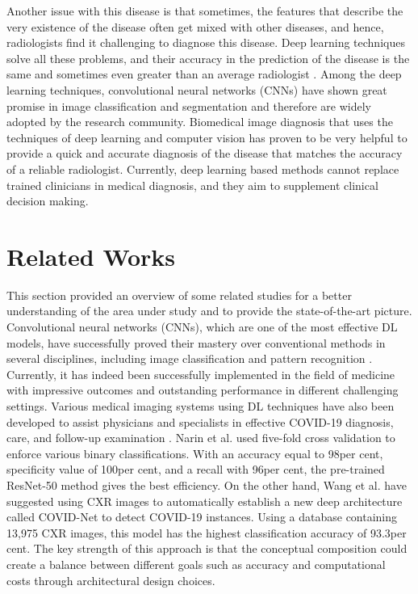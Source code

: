 \documentclass[a4paper,12pt]{report}
\begin{document}
Another issue with this disease is that sometimes, the features that describe the very existence of the disease often get mixed with other diseases, and hence, radiologists find it challenging to diagnose this disease. Deep learning techniques solve all these problems, and their accuracy in the prediction of the disease is the same and sometimes even greater than an average radiologist \cite{ref}. Among the deep learning techniques, convolutional neural networks (CNNs) have shown great promise in image classification and segmentation and therefore are widely adopted by the research community. Biomedical image diagnosis that uses the techniques of deep learning and computer vision has proven to be very helpful to provide a quick and accurate diagnosis of the disease that matches the accuracy of a reliable radiologist. Currently, deep learning based methods cannot replace trained clinicians in medical diagnosis, and they aim to supplement clinical decision making.

\section{Related Works}
This section provided an overview of some related studies for a better understanding
of the area under study and to provide the state-of-the-art picture. Convolutional neural
networks (CNNs), which are one of the most effective DL models, have successfully proved
their mastery over conventional methods in several disciplines, including image classification and pattern recognition \cite{ref13,ref14}. Currently, it has indeed been successfully implemented
in the field of medicine with impressive outcomes and outstanding performance in different
challenging settings. Various medical imaging systems using DL techniques have also been
developed to assist physicians and specialists in effective COVID-19 diagnosis, care, and
follow-up examination \cite{ref15,ref16}. Narin et al. \cite{ref11} used five-fold cross validation to enforce
various binary classifications. With an accuracy equal to 98per cent, specificity value of 100per cent,
and a recall with 96per cent, the pre-trained ResNet-50 method gives the best efficiency. On the
other hand, Wang et al. \cite{ref17} have suggested using CXR images to automatically establish a
new deep architecture called COVID-Net to detect COVID-19 instances. Using a database
containing 13,975 CXR images, this model has the highest classification accuracy of 93.3per cent.
The key strength of this approach is that the conceptual composition could create a balance
between different goals such as accuracy and computational costs through architectural
design choices.\\
\end{document}
